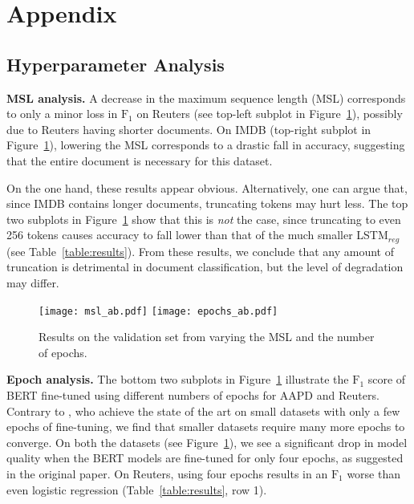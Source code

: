 \documentclass[11pt,a4paper]{article}
\newcommand{\parheader}[1]{{\smallskip \noindent \bf #1.}}
\newcommand{\FOne}{$\text{F}_1$}
\begin{document}
\section{Appendix} \label{appendix}

\subsection{Hyperparameter Analysis}

\parheader{MSL analysis}
A decrease in the maximum sequence length (MSL) corresponds to only a minor loss in \FOne{} on Reuters (see top-left subplot in Figure~\ref{fig:ablation}), possibly due to Reuters having shorter documents.
On IMDB (top-right subplot in Figure~\ref{fig:ablation}), lowering the MSL corresponds to a drastic fall in accuracy, suggesting that the entire document is necessary for this dataset.

On the one hand, these results appear obvious.
Alternatively, one can argue that, since IMDB contains longer documents, truncating tokens may hurt less.
The top two subplots in Figure~\ref{fig:ablation} show that this is \textit{not} the case, since truncating to even 256 tokens causes accuracy to fall lower than that of the much smaller LSTM$_{reg}$ (see Table~\ref{table:results}).
From these results, we conclude that any amount of truncation is detrimental in document classification, but the level of degradation may differ.

\begin{figure}[H]
\centering
\texttt{[image: msl\_ab.pdf]}
\texttt{[image: epochs\_ab.pdf]}
\caption{Results on the validation set from varying the MSL and the number of epochs.}
\label{fig:ablation}
\end{figure}

\parheader{Epoch analysis}
The bottom two subplots in Figure~\ref{fig:ablation} illustrate the \FOne{} score of BERT fine-tuned using different numbers of epochs for AAPD and Reuters.
Contrary to \citet{devlin2018bert}, who achieve the state of the art on small datasets with only a few epochs of fine-tuning, we find that smaller datasets require many more epochs to converge.
On both the datasets (see Figure~\ref{fig:ablation}), we see a significant drop in model quality when the BERT models are fine-tuned for only four epochs, as suggested in the original paper.
On Reuters, using four epochs results in an \FOne{} worse than even logistic regression (Table~\ref{table:results}, row 1).
\end{document}
